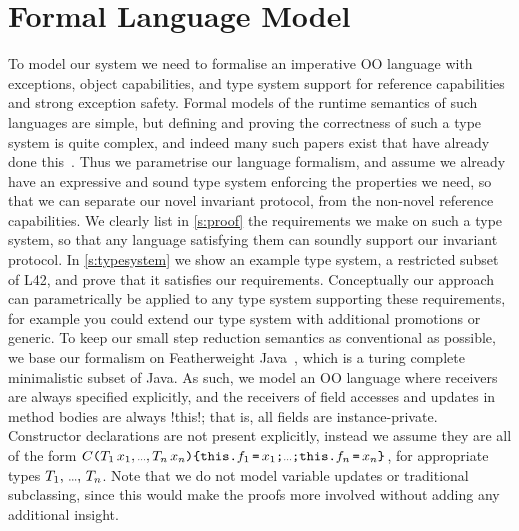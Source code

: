\section{Formal Language Model}
\lstset{language=FortyFour} %
\label{s:formalism}
To model our system we need to formalise an imperative OO language
with exceptions, object capabilities, and type system
support for reference capabilities and strong exception safety.
Formal models of the runtime semantics of such languages are simple, but
defining and proving the correctness of such a type system 
is quite complex, and indeed many such papers exist that have already done this~\cite{ServettoEtAl13a,ServettoZucca15,GordonEtAl12,clebsch2015deny,JOT:issue_2011_01/article1}.
Thus we parametrise our language formalism, and assume we already have an expressive and sound type system enforcing the properties we need, so
that we can separate our novel invariant protocol, from the non-novel reference capabilities.
We clearly list in \ref{s:proof} the requirements we make on such a type system, so that any language satisfying them can soundly support our invariant protocol.
In \ref{s:typesystem} we show an example type system, a restricted subset of L42, and prove that it satisfies our requirements. Conceptually our approach can parametrically be applied to any type system supporting these requirements, for example you could extend our type system with additional promotions or generic.
To keep our small step reduction semantics as conventional as possible, we base our formalism on Featherweight Java~\cite[Chapter~19]{IgarashiEtAl01,pierce2002types}, which is a turing complete~\cite{10.1016/j.tcs.2013.08.017} minimalistic subset of Java.
As such, we model an OO language where receivers are always specified explicitly, and the receivers of field accesses and updates in method bodies are always \Q!this!; that is, all fields are instance-private.
Constructor declarations are not present explicitly, instead we assume they are all of the form $C\oR \drange{T}{x} \cR\oC \drange[\semicolon]{\Kw{this}\D f}{\Kw{=}\,x} \cC$, for appropriate types $\range[\text{, }]{T}$. %
Note that we do not model variable updates or traditional subclassing, since this would make the proofs more involved without adding any additional insight.

